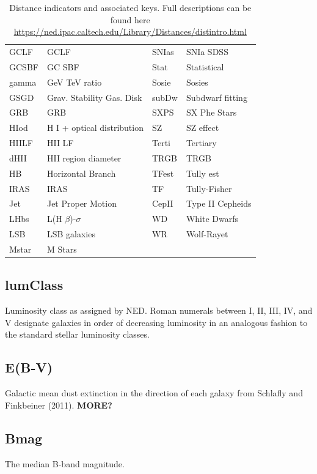 \documentclass[iop]{emulateapj-rtx4}
\begin{document}
\begin{table}[ht]
\begin{center}
\begin{tabular}{l l | l l}
    GCLF	&	GCLF				&	SNIas    	&	SNIa SDSS    	\\
    GCSBF	&	GC SBF				&	Stat    	&	Statistical    	\\
    gamma	&	GeV TeV ratio			&	Sosie    	&	Sosies    	\\
    GSGD	&	Grav. Stability Gas. Disk 	&	subDw    	&	Subdwarf fitting    	\\
    GRB	&	GRB					&	SXPS	&	SX Phe Stars    	\\
    HIod	&	H I + optical distribution	&	SZ    	&	SZ effect    	\\
    HIILF	&	HII LF				&	Terti		&	Tertiary    	\\
    dHII	&	HII region diameter		&	TRGB    	&	TRGB    	\\
    HB	&	Horizontal Branch    		&	TFest    	&	Tully est    	\\
    IRAS	&	IRAS    				&	TF		&	Tully-Fisher    	\\
    Jet	&	Jet Proper Motion    		&	CepII    	&	Type II Cepheids    	\\
    LHbs	&	L(H $\beta$)-$\sigma$	&	WD    	&	White Dwarfs    	\\
    LSB	&	LSB galaxies			&	WR    	&	Wolf-Rayet    	\\
    Mstar	&	M Stars				&			&					\\

\hline
\end{tabular}
\end{center}
  \caption{\small{Distance indicators and associated keys. Full descriptions can be found here \url{https://ned.ipac.caltech.edu/Library/Distances/distintro.html}}}
  \label{distIndicators}
\end{table}


\subsection{lumClass}
Luminosity class as assigned by NED. Roman numerals between I, II, III, IV, and V designate galaxies in order of decreasing luminosity in an analogous fashion to the standard stellar luminosity classes.

\subsection{E(B-V)}
Galactic mean dust extinction in the direction of each galaxy from Schlafly and Finkbeiner (2011). \textbf{MORE?}

\subsection{Bmag}
The median B-band magnitude.
\end{document}
